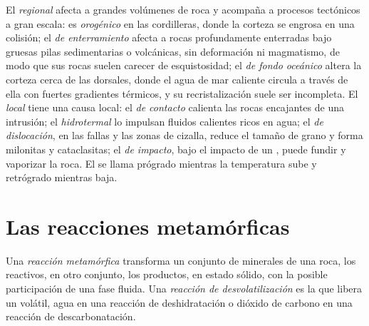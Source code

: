 El  \emph{regional} afecta a grandes volúmenes de roca y acompaña a procesos tectónicos
a gran escala: es \emph{orogénico} en las cordilleras, donde la corteza se engrosa en una
colisión; el  \emph{de enterramiento} afecta a rocas profundamente enterradas bajo gruesas
pilas sedimentarias o volcánicas, sin deformación ni magmatismo, de modo que sus rocas
suelen carecer de esquistosidad; el  \emph{de fondo oceánico} altera la corteza cerca de
las dorsales, donde el agua de mar caliente circula a través de ella con fuertes gradientes
térmicos, y su recristalización suele ser incompleta. El  \emph{local}
tiene una causa local: el  \emph{de contacto} calienta las rocas encajantes de una intrusión;
el  \emph{hidrotermal} lo impulsan fluidos calientes ricos en agua;
el  \emph{de dislocación}, en las fallas y las zonas de cizalla, reduce el tamaño de grano y
forma milonitas y cataclasitas; el  \emph{de impacto}, bajo el impacto de un ,
puede fundir y vaporizar la roca. El  se llama prógrado mientras la temperatura sube y
retrógrado mientras baja.

\section{Las reacciones metamórficas}\label{sec:b2:metamorphic-facies:reactions}

\begin{definition}\label{def:b2:metamorphic-facies:reaction}
Una \emph{reacción metamórfica} transforma un conjunto de minerales
de una roca, los reactivos, en otro conjunto, los productos, en estado sólido, con la posible
participación de una fase fluida. Una \emph{reacción de desvolatilización}
es la que libera un volátil, agua en una reacción de deshidratación o dióxido de
carbono en una reacción de descarbonatación.
\end{definition}

